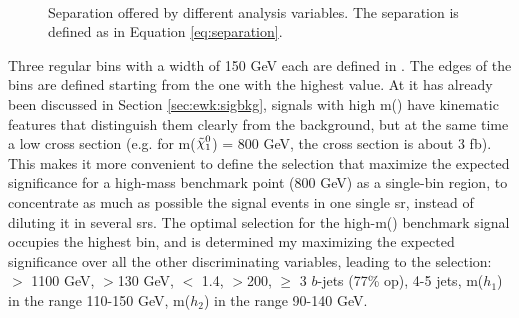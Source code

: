 \begin{figure}[htpb]
\begin{center}
\\
\caption{Separation offered by different analysis variables. The separation is defined as in Equation \ref{eq:separation}.}
\label{fig:ewk:separation}
\end{center}
\end{figure}

Three regular bins with a width of 150 GeV each are defined in \meffb. 
The edges of the bins are defined starting from the one with the highest value. 
At it has already been discussed in Section \ref{sec:ewk:sigbkg},
signals with high m(\hino) have kinematic features that distinguish them clearly from the background, 
but at the same time a low cross section (e.g. for m($\ninoone$) = 800 GeV, the cross section is about 3 fb). 
This makes it more convenient to define the selection that maximize the expected significance for a high-mass benchmark point (800 GeV) 
as a single-bin region, to concentrate as much as possible the signal events in one single \gls{sr}, 
instead of diluting it in several \glspl{sr}. %
The optimal selection for the high-m(\hino) benchmark signal occupies the highest \meffb bin,
and is determined my maximizing the expected significance over all the other discriminating variables,
leading to the selection:
\meffb $>$ 1100 GeV, \mtb$>$130 GeV, \dRmax $<$ 1.4, \met $>$200, $\geq$ 3 $b$-jets (77\% \gls{op}), 
4-5 jets, m($h_1$) in the range 110-150 GeV, m($h_2$) in the range 90-140 GeV.


